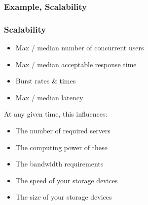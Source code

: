 \documentclass[10pt]{beamer}
\begin{document}
\begin{frame}[t]
\frametitle{Example, Scalability}
\centering
{}


\end{frame}

\begin{frame}[t]
\frametitle{Scalability}
\begin{itemize}
\item Max / median number of concurrent users
\item Max / median acceptable response time
\item Burst rates \& times
\item Max / median latency
\end{itemize}

At any given time, this influences:
\begin{itemize}
\item The number of required servers
\item The computing power of these
\item The bandwidth requirements
\item The speed of your storage devices
\item The size of your storage devices
\end{itemize}

\end{frame}
\end{document}
